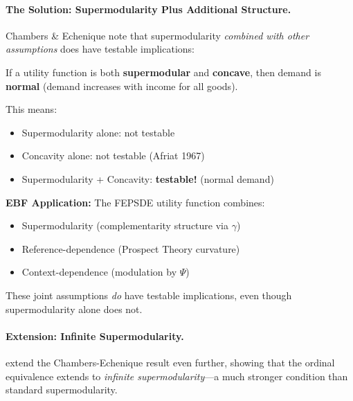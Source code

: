 \paragraph{The Solution: Supermodularity Plus Additional Structure.}

Chambers \& Echenique note that supermodularity \emph{combined with other 
assumptions} does have testable implications:

\begin{theorem}
\label{thm:chipman-quah}
If a utility function is both \textbf{supermodular} and \textbf{concave}, 
then demand is \textbf{normal} (demand increases with income for all goods).
\end{theorem}

This means:
\begin{itemize}
    \item Supermodularity alone: not testable
    \item Concavity alone: not testable (Afriat 1967)
    \item Supermodularity + Concavity: \textbf{testable!} (normal demand)
\end{itemize}

\textbf{EBF Application:}
The FEPSDE utility function combines:
\begin{itemize}
    \item Supermodularity (complementarity structure via $\gamma$)
    \item Reference-dependence (Prospect Theory curvature)
    \item Context-dependence (modulation by $\Psi$)
\end{itemize}

These joint assumptions \emph{do} have testable implications, even though 
supermodularity alone does not.


\paragraph{Extension: Infinite Supermodularity.}

\citet{chateauneuf2017infinite} extend the Chambers-Echenique result even further, 
showing that the ordinal equivalence extends to \emph{infinite supermodularity}---a 
much stronger condition than standard supermodularity.

